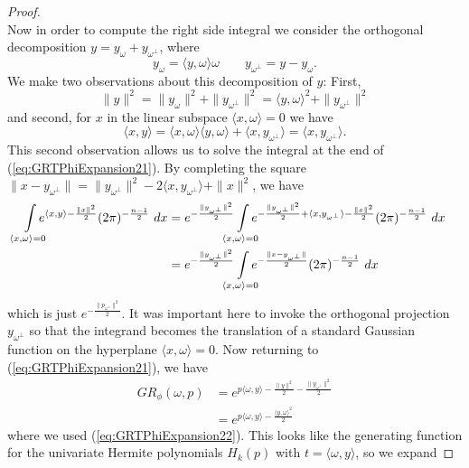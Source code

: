 \begin{proof}
\begin{equation}
  \end{equation}
  Now in order to compute the right side integral we consider the orthogonal decomposition $y = y_\omega + y_{\omega^\perp}$, where
  \[
    y_\omega = \langle y, \omega \rangle \omega \qquad y_{\omega^\perp} = y - y_\omega.
  \]
  We make two observations about this decomposition of $y$: First, 
  \begin{equation}\label{eq:GRTPhiExpansion22}
    \|y\|^2 
      = \|y_\omega\|^2 + \|y_{\omega^\perp}\|^2 
      = \langle y, \omega\rangle^2 + \|y_{\omega^\perp}\|^2
  \end{equation}
  and second, for $x$ in the linear subspace $\langle x, \omega\rangle = 0$ we have
  \[
    \langle x, y \rangle
      = \langle x, \omega \rangle \langle y, \omega \rangle + \langle x, y_{\omega^\perp} \rangle 
      = \langle x, y_{\omega^\perp} \rangle.
  \]
  This second observation allows us to solve the integral at the end of (\ref{eq:GRTPhiExpansion21}). By completing the square $\|x - y_{\omega^\perp}\| = \|y_{\omega^\perp}\|^2 - 2\langle x, y_{\omega^\perp} \rangle + \|x\|^2$, we have
  \begin{align*}
    \int\mclimits_{\langle x, \omega\rangle = 0}e^{\langle x, y\rangle - \frac{\|x\|^2}2} (2\pi)^{-\frac{n-1}2} ~dx
      &= e^{-\frac{\|y_{\omega^\perp}\|^2}2} \int\mclimits_{\langle x, \omega\rangle = 0}e^{-\frac{\|y_{\omega^\perp}\|^2}2 + \langle x, y_{\omega^\perp}\rangle - \frac{\|x\|^2}2} (2\pi)^{-\frac{n-1}2} ~dx
    \\&= e^{-\frac{\|y_{\omega^\perp}\|^2}2} \int\mclimits_{\langle x, \omega\rangle = 0}e^{-\frac{\|x - y_{\omega^\perp}\|}2} (2\pi)^{-\frac{n-1}2} ~dx
  \end{align*}
  which is just $e^{-\frac{\|p_{\omega^\perp}\|^2}2}$. It was important here to invoke the orthogonal projection $y_{\omega^\perp}$ so that the integrand becomes the translation of a standard Gaussian function on the hyperplane $\langle x, \omega \rangle = 0$. Now returning to (\ref{eq:GRTPhiExpansion21}), we have
  \begin{align*}
    GR_{\phi}(\omega, p) 
      &= e^{p \langle \omega, y\rangle - \frac{\|y\|^2}2-\frac{\|y_{\omega^\perp}\|^2}2}
    \\
      &= e^{p \langle \omega, y\rangle - \frac{\langle y, \omega\rangle^2}2}
  \end{align*}
  where we used (\ref{eq:GRTPhiExpansion22}). This looks like the generating function for the univariate Hermite polynomials $H_k(p)$ with $t = \langle \omega, y \rangle$, so we expand

\end{proof}
